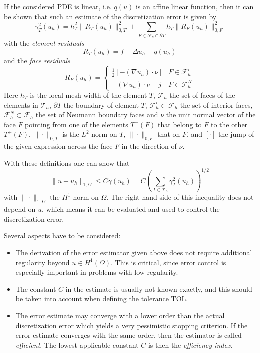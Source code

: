 \documentclass[a4paper,12pt]{article}
\begin{document}
If the considered PDE is linear, i.e. $q(u)$ is an affine linear function, then it can be shown
that such an estimate of the discretization error is given by
\begin{equation*}
  \gamma_T^2(u_h) = h_T^2 \| R_T(u_h) \|_{0,T}^2 + \sum_{F \in \mathcal{F}_h \cap \partial T} h_T \| R_F(u_h) \|_{0,F}^2
\end{equation*}
with the \emph{element residuals}
\begin{equation*}
  R_T(u_h) = f + \Delta u_h - q(u_h)
\end{equation*}
and the \emph{face residuals}
\begin{equation*}
  R_F(u_h) = \begin{cases} \frac{1}{2} [-(\nabla u_h) \cdot \nu] & F \in \mathcal{F}_h^i \\ - (\nabla u_h) \cdot \nu - j & F \in \mathcal{F}_h^N \end{cases}
\end{equation*}
Here $h_T$ is the local mesh width of the element $T$, $\mathcal{F}_h$ the set of faces of the elements
in $\mathcal{T}_h$, $\partial T$ the boundary of element $T$, $\mathcal{F}_h^i \subset \mathcal{F}_h$
the set of interior faces, $\mathcal{F}_h^N \subset \mathcal{F}_h$ the set of Neumann boundary faces and
$\nu$ the unit normal vector of the face $F$ pointing from one of the elements $T^-(F)$ that belong to
$F$ to the other $T^+(F)$. $\|\cdot\|_{0,T}$ is the $L^2$ norm on $T$, $\|\cdot\|_{0,F}$ that on $F$,
and $[\cdot]$ the jump of the given expression across the face $F$ in the direction of $\nu$.

With these definitions one can show that
\begin{equation*}
  \|u - u_h\|_{1,\Omega} \leq C \gamma(u_h) = C \left( \sum_{T \in {\mathcal T}_h} \gamma_T^2(u_h) \right)^{1/2}
\end{equation*}
with $\|\cdot\|_{1,\Omega}$ the $H^1$ norm on $\Omega$. The right hand side of this inequality does not
depend on $u$, which means it can be evaluated and used to control the discretization error.

Several aspects have to be considered:
\begin{itemize}
  \item The derivation of the error estimator given above does not require additional regularity
    beyond $u \in H^1(\Omega)$. This is critical, since error control is especially important
    in problems with low regularity.
  \item The constant $C$ in the estimate is usually not known exactly, and this should be taken
    into account when defining the tolerance $\text{TOL}$.
  \item The error estimate may converge with a lower order than the actual discretization error
    which yields a very pessimistic stopping criterion. If the error estimate converges with the
    same order, then the estimator is called \emph{efficient}. The lowest applicable constant $C$
    is then the \emph{efficiency index}.
\end{itemize}
\end{document}
